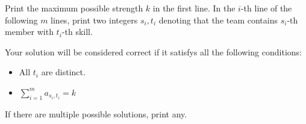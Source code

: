 Print the maximum possible strength $k$ in the first line.
In the $i$-th line of the following $m$ lines, print two integers $s_i,t_i$ denoting that the team contains $s_i$-th member with $t_i$-th skill.

Your solution will be considered correct if it satisfys all the following conditions:
\begin{itemize}
    \item All $t_i$ are distinct.
    \item $\displaystyle \sum_{i=1}^{m} a_{s_i,t_i} = k$
\end{itemize}
If there are multiple possible solutions, print any.
